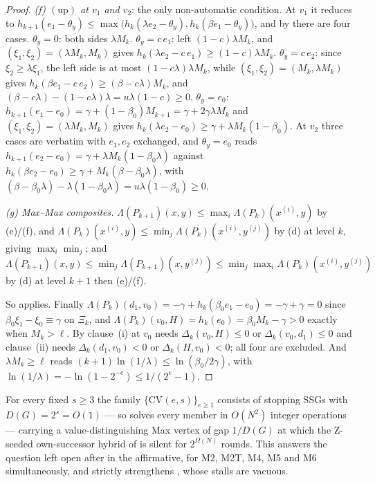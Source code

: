 \begin{proof}
\emph{(f) $(\mathrm{up})$ at $v_1$ and $v_2$}: the only non-automatic
condition. At $v_1$ it reduces to
$h_{k+1}(e_1-\theta_y)\le\max\bigl(h_k(\lambda e_2-\theta_y),
h_k(\beta e_1-\theta_y)\bigr)$, and by  there are four
cases. $\theta_y=0$: both sides $\lambda M_k$. $\theta_y=c\,e_1$: left
$(1-c)\lambda M_k$, and $(\xi_1,\xi_2)=(\lambda M_k,M_k)$ gives
$h_k(\lambda e_2-c\,e_1)\ge(1-c)\lambda M_k$. $\theta_y=c\,e_2$: since
$\xi_2\ge\lambda\xi_1$, the left side is at most $(1-c\lambda)\lambda M_k$,
while $(\xi_1,\xi_2)=(M_k,\lambda M_k)$ gives
$h_k(\beta e_1-c\,e_2)\ge(\beta-c\lambda)M_k$, and
$(\beta-c\lambda)-(1-c\lambda)\lambda=u\lambda(1-c)\ge0$. $\theta_y=e_0$:
$h_{k+1}(e_1-e_0)=\gamma+(1-\beta_0)M_{k+1}=\gamma+2\gamma\lambda M_k$ and
$(\xi_1,\xi_2)=(\lambda M_k,M_k)$ gives $h_k(\lambda e_2-e_0)\ge
\gamma+\lambda M_k(1-\beta_0)$. At $v_2$ three cases are verbatim with
$e_1,e_2$ exchanged, and $\theta_y=e_0$ reads
$h_{k+1}(e_2-e_0)=\gamma+\lambda M_k(1-\beta_0\lambda)$ against
$h_k(\beta e_2-e_0)\ge\gamma+M_k(\beta-\beta_0\lambda)$, with
$(\beta-\beta_0\lambda)-\lambda(1-\beta_0\lambda)=u\lambda(1-\beta_0)\ge0$.

\emph{(g) Max--Max composites.} $\Lambda(P_{k+1})(x,y)\le
\max_i\Lambda(P_k)(x^{(i)},y)$ by (e)/(f), and
$\Lambda(P_k)(x^{(i)},y)\le\min_j\Lambda(P_k)(x^{(i)},y^{(j)})$ by (d) at level
$k$, giving $\max_i\min_j$; and $\Lambda(P_{k+1})(x,y)\le
\min_j\Lambda(P_{k+1})(x,y^{(j)})\le\min_j\max_i\Lambda(P_k)(x^{(i)},y^{(j)})$
by (d) at level $k+1$ then (e)/(f).

So  applies. Finally
$\Lambda(P_k)(d_1,v_0)=-\gamma+h_k(\beta_0e_1-e_0)=-\gamma+\gamma=0$ since
$\beta_0\xi_1-\xi_0\equiv\gamma$ on $\Xi_k$, and
$\Lambda(P_k)(v_0,H)=h_k(e_0)=\beta_0M_k-\gamma>0$ exactly when $M_k>\ell$.
By  clause~(i) at $v_0$ needs $\Delta_k(v_0,H)\le0$ or
$\Delta_k(v_0,d_1)\le0$ and clause~(ii) needs $\Delta_k(d_1,v_0)<0$ or
$\Delta_k(H,v_0)<0$; all four are excluded. And $\lambda M_k\ge\ell$ reads
$(k+1)\ln(1/\lambda)\le\ln(\beta_0/2\gamma)$, with
$\ln(1/\lambda)=-\ln(1-2^{-e})\le 1/(2^{e}-1)$.
\end{proof}

\begin{corollary}\label{cor:fd-cv-class}
For every fixed $s\ge3$ the family $\{\mathrm{CV}(e,s)\}_{e\ge1}$ consists of
stopping SSGs with $D(G)=2^{s}=O(1)$ --- so  solves
every member in $O(N^{2})$ integer operations --- carrying a
value-distinguishing Max vertex of gap $1/D(G)$ at which the Z-seeded
own-successor hybrid of  is silent for $2^{\Omega(N)}$ rounds.
This answers the question left open after  in the
affirmative, for M2, M2T, M4, M5 and M6 simultaneously, and strictly
strengthens , whose stalls are vacuous.
\end{corollary}

